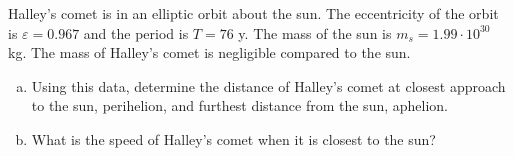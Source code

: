   Halley's comet is in an elliptic orbit about the sun. The eccentricity of the orbit is $\varepsilon = 0.967$ and the period is $T = 76$ y. The mass of the sun is $m_s = 1.99 \cdot 10^{30}$ kg.  The mass of Halley's comet is negligible compared to the sun.
  \begin{enumerate}[(a)]
    \item Using this data, determine the distance of Halley's comet at closest approach to the sun, perihelion, and furthest distance from the sun, aphelion.
    \item What is the speed of Halley's comet when it is closest to the sun?
  \end{enumerate}
